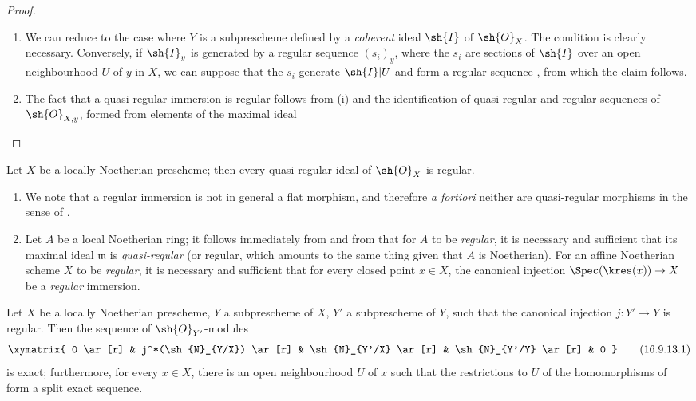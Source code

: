 \begin{proof}
  \begin{enumerate}
    \item[\rm{(i)}] We can reduce to the case where $Y$ is a subprescheme defined by a \emph{coherent} ideal $\sh{I}$ of $\sh{O}_X$.
    The condition is clearly necessary.
    Conversely, if $\sh{I}_y$ is generated by a regular sequence $(s_i)_y$, where the $s_i$ are sections of $\sh{I}$ over an open neighbourhood $U$ of $y$ in $X$, we can suppose that the $s_i$ generate $\sh{I}|U$  and form a regular sequence , from which the claim follows.
    \item[\rm{(ii)}] The fact that a quasi-regular immersion is regular follows from (i) and the identification of quasi-regular and regular sequences of $\sh{O}_{X,y}$, formed from elements of the maximal ideal 
  \end{enumerate}
\end{proof}

\begin{corollary}[16.9.11]
\label{IV.16.9.11}
Let $X$ be a locally Noetherian prescheme;
then every quasi-regular ideal of $\sh{O}_X$ is regular.
\end{corollary}

\begin{remarks}[16.9.12]
\label{IV.16.9.12}
\begin{enumerate}
  \item[\rm{(i)}] We note that a regular immersion is not in general a flat morphism, and therefore \textit{a fortiori} neither are quasi-regular morphisms in the sense of .
  \item[\rm{(ii)}] Let $A$ be a local Noetherian ring;
  it follows immediately from  and from  that for $A$ to be \emph{regular}, it is necessary and sufficient that its maximal ideal $\mathfrak{m}$ is \emph{quasi-regular} (or regular, which amounts to the same thing given that $A$ is Noetherian).
  For an affine Noetherian scheme $X$ to be \emph{regular}, it is necessary and sufficient that for every closed point $x \in X$, the canonical injection $\Spec(\kres(x)) \to X$ be a \emph{regular} immersion.
\end{enumerate}
\end{remarks}

\begin{proposition}[16.9.13]
\label{IV.16.9.13}
Let $X$ be a locally Noetherian prescheme, $Y$ a subprescheme of $X$, $Y'$ a subprescheme of $Y$, such that the canonical injection $j:Y' \to Y$ is regular. 
Then the sequence of $\sh{O}_{Y'}$-modules
\[
  \label{IV.16.9.13.1}
  \xymatrix{
    0 \ar[r] & j^*(\sh{N}_{Y/X}) \ar[r] & \sh{N}_{Y'/X} \ar[r] & \sh{N}_{Y'/Y} \ar[r] & 0
  }
  \tag{16.9.13.1}
\]
is exact;
furthermore, for every $x \in X$, there is an open neighbourhood $U$ of $x$ such that the restrictions to $U$ of the homomorphisms of  form a split exact sequence.
\end{proposition}

